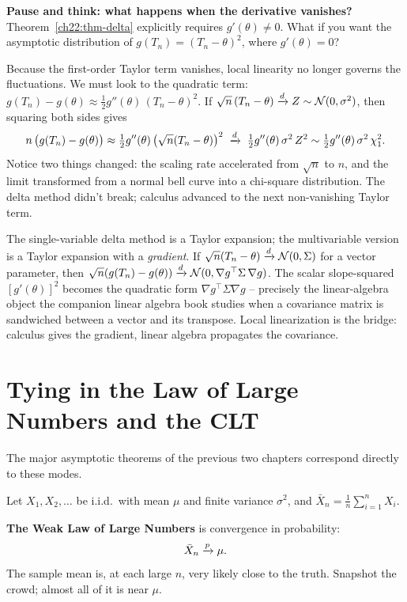 \begin{walkbox}
\textbf{Pause and think: what happens when the derivative vanishes?}
Theorem~\ref{ch22:thm-delta} explicitly requires $g'(\theta) \ne 0$. What if you want the
asymptotic distribution of $g(T_n) = (T_n - \theta)^2$, where $g'(\theta) = 0$?

Because the first-order Taylor term vanishes, local linearity no longer governs the
fluctuations. We must look to the quadratic term:
$g(T_n) - g(\theta) \approx \frac{1}{2} g''(\theta)\,(T_n - \theta)^2$.
If $\sqrt n\,(T_n - \theta) \xrightarrow{d} Z \sim \mathcal{N}(0,\sigma^2)$, then squaring both sides
gives
\[
  n\,\big(g(T_n) - g(\theta)\big) \approx \tfrac{1}{2} g''(\theta)\,\big(\sqrt n(T_n-\theta)\big)^2
  \;\xrightarrow{d}\; \tfrac{1}{2} g''(\theta)\,\sigma^2\,Z^2
  \sim \tfrac{1}{2} g''(\theta)\,\sigma^2\,\chi^2_1.
\]
Notice two things changed: the scaling rate accelerated from $\sqrt n$ to $n$, and the
limit transformed from a normal bell curve into a chi-square distribution. The delta
method didn't break; calculus advanced to the next non-vanishing Taylor term.
\end{walkbox}

\begin{connectionbox}
The single-variable delta method is a Taylor expansion; the multivariable version is a
Taylor expansion with a \emph{gradient}. If $\sqrt n(T_n-\theta)\xrightarrow{d}\mathcal{N}(0,\Sigma)$
for a vector parameter, then $\sqrt n(g(T_n)-g(\theta))\xrightarrow{d}\mathcal{N}(0,\nabla g^\top
\Sigma\,\nabla g)$. The scalar slope-squared $[g'(\theta)]^2$ becomes the quadratic
form $\nabla g^\top\Sigma\nabla g$ -- precisely the linear-algebra object the companion
linear algebra book studies when a covariance matrix is sandwiched between a vector and
its transpose. Local linearization is the bridge: calculus gives the gradient, linear
algebra propagates the covariance.
\end{connectionbox}

\section{Tying in the Law of Large Numbers and the CLT}
\label{ch22:lln-clt}

The major asymptotic theorems of the previous two chapters correspond directly to these modes.

Let $X_1,X_2,\dots$ be i.i.d.\ with mean $\mu$ and finite variance $\sigma^2$, and
$\bar X_n = \frac1n\sum_{i=1}^n X_i$.

\textbf{The Weak Law of Large Numbers} is convergence in probability:
\[
  \bar X_n \xrightarrow{p} \mu.
\]
The sample mean is, at each large $n$, very likely close to the truth. Snapshot the
crowd; almost all of it is near $\mu$.

